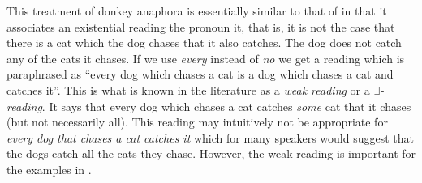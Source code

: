 This treatment of donkey anaphora is essentially similar to that of
\cite{Chierchia1995} in that it associates an existential reading the
pronoun it, that is, it is not the case that there is a cat which the
dog chases that it also catches.  The dog does not catch any of the
cats it chases.  If we use \textit{every} instead of \textit{no} we
get a reading which is paraphrased as ``every dog which chases a cat
is a dog which chases a cat and catches it''.  This is what is known
in the literature as a \textit{weak reading} or a
\textit{$\exists$-reading}. It says that every dog which chases a cat
catches \textit{some} cat that it chases (but not necessarily all).
This reading may intuitively not be appropriate for \textit{every dog
  that chases a cat catches it} which for many speakers would suggest
that the dogs catch all the cats they chase.  However, the weak
reading is important for the examples in \nexteg{}.

